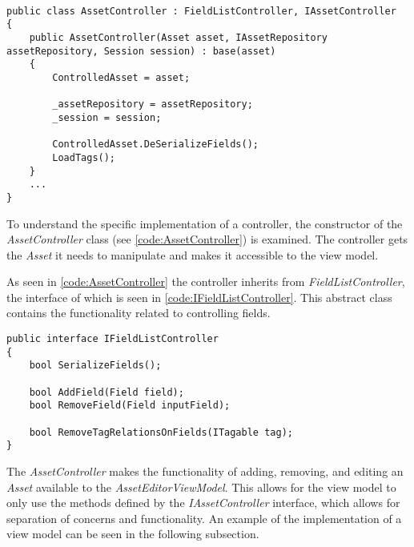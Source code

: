 \begin{listing}[H]
\begin{verbatim}

public class AssetController : FieldListController, IAssetController
{
    public AssetController(Asset asset, IAssetRepository assetRepository, Session session) : base(asset)
    {
        ControlledAsset = asset;

        _assetRepository = assetRepository;
        _session = session;

        ControlledAsset.DeSerializeFields();
        LoadTags();
    }
    ...
}
\end{verbatim}
\label{code:AssetController}
\end{listing}

To understand the specific implementation of a controller, the constructor of the \textit{AssetController} class (see \autoref{code:AssetController}) is examined. The controller gets the \textit{Asset} it needs to manipulate and makes it accessible to the view model.
\par
As seen in \autoref{code:AssetController} the controller inherits from \textit{FieldListController}, the interface of which is seen in \autoref{code:IFieldListController}. This abstract class contains the functionality related to controlling fields.

\begin{listing}[H]
\begin{verbatim}
public interface IFieldListController
{
    bool SerializeFields();

    bool AddField(Field field);
    bool RemoveField(Field inputField);
    
    bool RemoveTagRelationsOnFields(ITagable tag);
}
\end{verbatim}
\label{code:IFieldListController}
\end{listing}

The \textit{AssetController} makes the functionality of adding, removing, and editing an \textit{Asset} available to the \textit{AssetEditorViewModel}. This allows for the view model to only use the methods defined by the \textit{IAssetController} interface, which allows for separation of concerns and functionality. An example of the implementation of a view model can be seen in the following subsection.